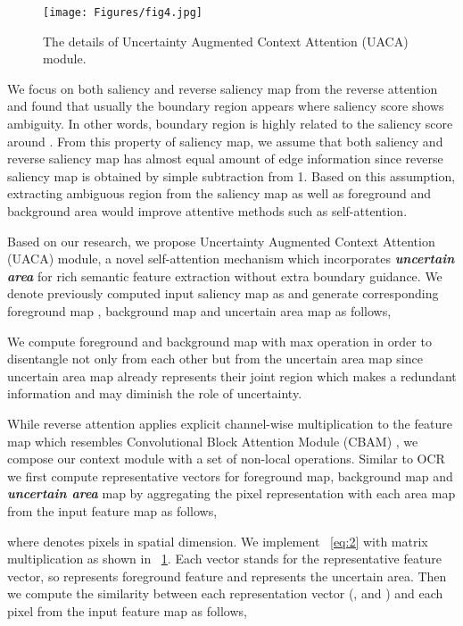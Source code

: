 \documentclass[sigconf]{acmart}
\begin{document}
\begin{figure}[]
  \centering
  \texttt{[image: Figures/fig4.jpg]}
  \caption{The details of Uncertainty Augmented Context Attention (UACA) module.}
    \label{fig:4}
\end{figure}

We focus on both saliency and reverse saliency map from the reverse attention and found that usually the boundary region appears where saliency score shows ambiguity. In other words, boundary region is highly related to the saliency score around . From this property of saliency map, we assume that both saliency and reverse saliency map has almost equal amount of edge information since reverse saliency map is obtained by simple subtraction from 1. Based on this assumption, extracting ambiguous region from the saliency map as well as foreground and background area would improve attentive methods such as self-attention. 


Based on our research, we propose Uncertainty Augmented Context Attention (UACA) module, a novel self-attention mechanism which incorporates \textbf{\textit{uncertain area}} for rich semantic feature extraction without extra boundary guidance. We denote previously computed input  saliency map as  and generate corresponding foreground map , background map  and uncertain area map  as follows,


We compute foreground and background map with max operation in order to disentangle not only from each other but from the uncertain area map  since uncertain area map already represents their joint region which makes a redundant information and may diminish the role of uncertainty.

While reverse attention applies explicit channel-wise multiplication to the feature map which resembles Convolutional Block Attention Module (CBAM) \cite{woo2018cbam}, we compose our context module with a set of non-local operations. Similar to OCR \cite{yuan2019object} we first compute representative vectors for foreground map, background map and \textbf{\textit{uncertain area}} map by aggregating the pixel representation with each area map from the input feature map  as follows,


where  denotes pixels in spatial dimension. We implement \equationautorefname~\ref{eq:2} with matrix multiplication as shown in \figureautorefname~\ref{fig:4}. Each vector stands for the representative feature vector, so  represents foreground feature and  represents the uncertain area. Then we compute the similarity between each representation vector (,  and ) and each pixel from the input feature map  as follows,
\end{document}
